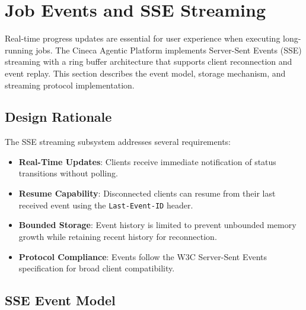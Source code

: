
\section{Job Events and SSE Streaming}
\label{sec:job-events}

Real-time progress updates are essential for user experience when executing long-running jobs. The Cineca Agentic Platform implements Server-Sent Events (SSE) streaming with a ring buffer architecture that supports client reconnection and event replay. This section describes the event model, storage mechanism, and streaming protocol implementation.

\subsection{Design Rationale}

The SSE streaming subsystem addresses several requirements:

\begin{itemize}
    \item \textbf{Real-Time Updates}: Clients receive immediate notification of status transitions without polling.
    
    \item \textbf{Resume Capability}: Disconnected clients can resume from their last received event using the \texttt{Last-Event-ID} header.
    
    \item \textbf{Bounded Storage}: Event history is limited to prevent unbounded memory growth while retaining recent history for reconnection.
    
    \item \textbf{Protocol Compliance}: Events follow the W3C Server-Sent Events specification for broad client compatibility.
\end{itemize}

\subsection{SSE Event Model}

